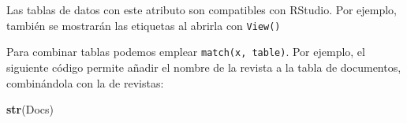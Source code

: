 \documentclass[
]{book}
\newenvironment{Shaded}{\begin{snugshade}}{\end{snugshade}}
\newcommand{\CommentTok}[1]{\textcolor[rgb]{0.56,0.35,0.01}{\textit{#1}}}
\newcommand{\FunctionTok}[1]{\textcolor[rgb]{0.13,0.29,0.53}{\textbf{#1}}}
\newcommand{\NormalTok}[1]{#1}
\newcommand{\OtherTok}[1]{\textcolor[rgb]{0.56,0.35,0.01}{#1}}
\newcommand{\SpecialCharTok}[1]{\textcolor[rgb]{0.81,0.36,0.00}{\textbf{#1}}}
\newcommand{\StringTok}[1]{\textcolor[rgb]{0.31,0.60,0.02}{#1}}
\theoremstyle{break}
\theoremstyle{nonumberplain}
\renewcommand{\CommentTok}[1]{\textcolor[rgb]{0.41,0.41,0.41}{\texttt{#1}}}
\begin{document}
Las tablas de datos con este atributo son compatibles con RStudio.
Por ejemplo, también se mostrarán las etiquetas al abrirla con \texttt{View()}

\begin{Shaded}
\end{Shaded}

Para combinar tablas podemos emplear \texttt{match(x,\ table)}.
Por ejemplo, el siguiente código permite añadir el nombre de la revista a la
tabla de documentos, combinándola con la de revistas:

\begin{Shaded}
\begin{Highlighting}[]
\FunctionTok{str}\NormalTok{(Docs)}
\end{Highlighting}
\end{Shaded}
\end{document}
